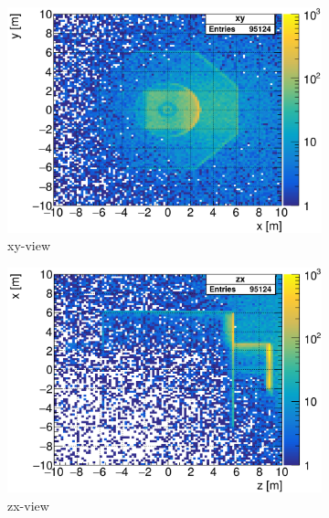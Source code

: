 \begin{figure}[!b]
 \centering
  \begin{subfigure}[b]{0.46\textwidth}
   \centering
    \includegraphics[width=\textwidth]{Figures/BeamDump/neutrons_EndpointMap_xy.png}
   \caption{xy-view}
   \end{subfigure}
   \hfill
   \begin{subfigure}[b]{0.46\textwidth}
   \centering
    \includegraphics[width=\textwidth]{Figures/BeamDump/neutrons_EndpointMap_zx.png}
   \caption{zx-view}
   \end{subfigure}\\
    \begin{subfigure}[b]{0.46\textwidth}
   \centering

\end{subfigure}
\end{figure}
